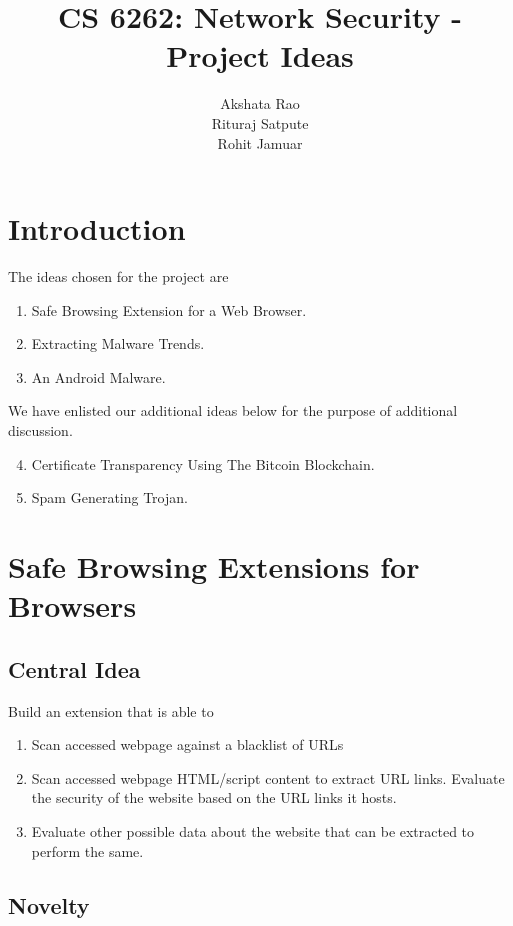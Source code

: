\documentclass[a4paper]{article}
\title{CS 6262: Network Security -  Project Ideas}
\author{Akshata Rao \\ Rituraj Satpute \\ Rohit Jamuar}
\begin{document}
\maketitle

\section*{Introduction}

The ideas chosen for the project are
\begin{enumerate}
\item Safe Browsing Extension for a Web Browser.
\item Extracting Malware Trends.
\item An Android Malware.
\end{enumerate}

We have enlisted our additional ideas below for the purpose of additional discussion.
\begin{enumerate}
\setcounter{enumi}{3}
\item Certificate Transparency Using The Bitcoin Blockchain.
\item Spam Generating Trojan.
\end{enumerate}

\section{Safe Browsing Extensions for Browsers}
\label{sec:i1}

\subsection{Central Idea}
Build an extension that is able to 
\begin{enumerate}
\item Scan accessed webpage against a blacklist of URLs

\item Scan accessed webpage HTML/script content to extract URL links. Evaluate the security of the website based on the URL links it hosts.

\item Evaluate other possible data about the website that can be extracted to perform the same.

\end{enumerate}

\subsection{Novelty}
\end{document}
